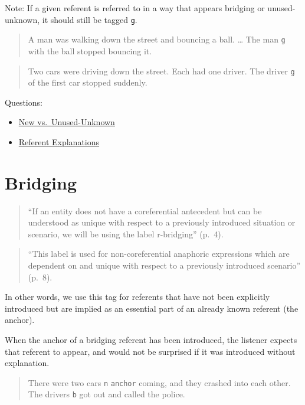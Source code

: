 \documentclass[
]{book}
\providecommand{\tightlist}{%
  \setlength{\itemsep}{0pt}\setlength{\parskip}{0pt}}
\begin{document}
Note:
If a given referent is referred to in a way that appears
bridging or unused-unknown, it should still be tagged \texttt{g}.

\begin{quote}
A man was walking down the street and bouncing a ball.
\ldots{}
The man \texttt{g} with the ball stopped bouncing it.
\end{quote}

\begin{quote}
Two cars were driving down the street.
Each had one driver.
The driver \texttt{g} of the first car stopped suddenly.
\end{quote}

Questions:

\begin{itemize}
\tightlist
\item
  \protect\hyperlink{new-vs.-unused-unknown}{New vs.~Unused-Unknown}
\item
  \protect\hyperlink{referent-explanations}{Referent Explanations}
\end{itemize}

\hypertarget{bridging}{%
\section{Bridging}\label{bridging}}

\begin{quote}
``If an entity does not have a coreferential antecedent but can be understood as unique with respect to a previously introduced situation or scenario, we will be using the label r-bridging'' (p.~4).
\end{quote}

\begin{quote}
``This label is used for non-coreferential anaphoric expressions which are dependent on and unique with respect to a previously introduced scenario'' (p.~8).
\end{quote}

In other words, we use this tag for referents that have not been explicitly introduced but are implied as an essential part of an already known referent (the anchor).

When the anchor of a bridging referent has been introduced,
the listener expects that referent to appear,
and would not be surprised if it was introduced without explanation.

\begin{quote}
There were two cars \texttt{n} \texttt{anchor} coming, and they crashed into each other.
The drivers \texttt{b} got out and called the police.
\end{quote}
\end{document}
